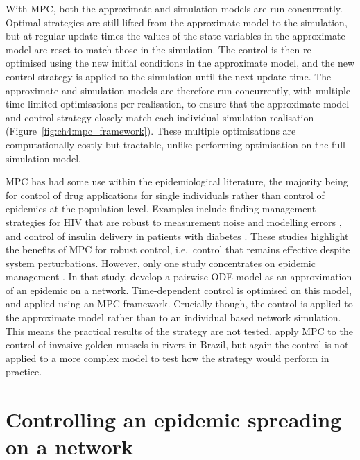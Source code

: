 With MPC, both the approximate and simulation models are run concurrently. Optimal strategies are still lifted from the approximate model to the simulation, but at regular update times the values of the state variables in the approximate model are reset to match those in the simulation. The control is then re-optimised using the new initial conditions in the approximate model, and the new control strategy is applied to the simulation until the next update time. The approximate and simulation models are therefore run concurrently, with multiple time-limited optimisations per realisation, to ensure that the approximate model and control strategy closely match each individual simulation realisation (Figure~\ref{fig:ch4:mpc_framework}). These multiple optimisations are computationally costly but tractable, unlike performing optimisation on the full simulation model.

MPC has had some use within the epidemiological literature, the majority being for control of drug applications for single individuals rather than control of epidemics at the population level. Examples include finding management strategies for HIV that are robust to measurement noise and modelling errors \citep{zurakowski_model_2006, david_receding_2011}, and control of insulin delivery in patients with diabetes \citep{hovorka_nonlinear_2004}. These studies highlight the benefits of MPC for robust control, i.e.\ control that remains effective despite system perturbations. However, only one study concentrates on epidemic management \citep{selley_dynamic_2015}. In that study, \citeauthor{selley_dynamic_2015} develop a pairwise ODE model as an approximation of an epidemic on a network. Time-dependent control is optimised on this model, and applied using an MPC framework. Crucially though, the control is applied to the approximate model rather than to an individual based network simulation. This means the practical results of the strategy are not tested. \citet{de_model_2019} apply MPC to the control of invasive golden mussels in rivers in Brazil, but again the control is not applied to a more complex model to test how the strategy would perform in practice.

\section{Controlling an epidemic spreading on a network\label{sec:ch4:Controlling}}

